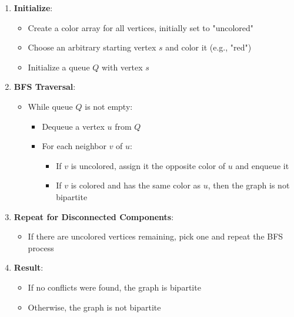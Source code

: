 \documentclass{article}
\theoremstyle{definition}
\begin{document}
\begin{enumerate}
\item \textbf{Initialize}: 
   \begin{itemize}
   \item Create a color array for all vertices, initially set to "uncolored"
   \item Choose an arbitrary starting vertex $s$ and color it (e.g., "red")
   \item Initialize a queue $Q$ with vertex $s$
   \end{itemize}

\item \textbf{BFS Traversal}:
   \begin{itemize}
   \item While queue $Q$ is not empty:
      \begin{itemize}
      \item Dequeue a vertex $u$ from $Q$
      \item For each neighbor $v$ of $u$:
         \begin{itemize}
         \item If $v$ is uncolored, assign it the opposite color of $u$ and enqueue it
         \item If $v$ is colored and has the same color as $u$, then the graph is not bipartite
         \end{itemize}
      \end{itemize}
   \end{itemize}

\item \textbf{Repeat for Disconnected Components}:
   \begin{itemize}
   \item If there are uncolored vertices remaining, pick one and repeat the BFS process
   \end{itemize}

\item \textbf{Result}:
   \begin{itemize}
   \item If no conflicts were found, the graph is bipartite
   \item Otherwise, the graph is not bipartite
   \end{itemize}
\end{enumerate}
\end{document}
